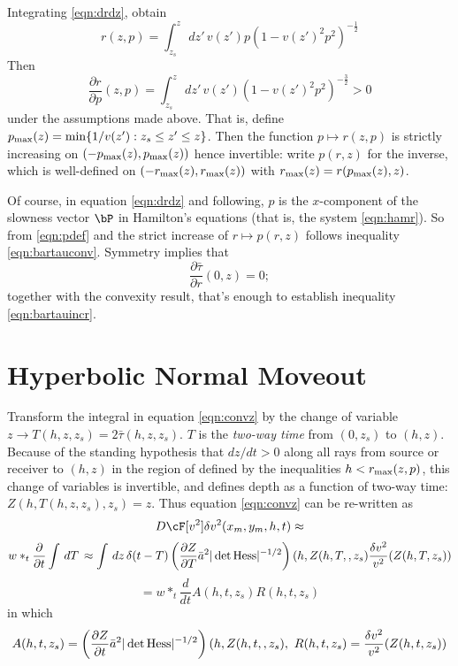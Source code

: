 Integrating \ref{eqn:drdz}, obtain
\begin{equation}
\label{eqn:intrz}
r(z,p)=\int_{z_s}^z \,dz' \, v(z')p (1-v(z')^2 p^2)^{-\frac{1}{2}}
\end{equation}
Then 
\begin{equation}
\label{eqn:drdp}
\frac{\partial r}{\partial p}(z,p) = \int_{z_s}^z \,dz' \, v(z') (1-v(z')^2 p^2)^{-\frac{3}{2}} >0
\end{equation}
under the assumptions made above. That is, define $p_{\rm max}(z) = \min \{1/v(z'): z_s \le z' \le z\}$. Then the function
$p \mapsto r(z,p)$ is strictly increasing on $(-p_{\rm max}(z),p_{\rm max}(z))$ hence invertible: write $p(r,z)$ for the inverse, which is well-defined on $(-r_{\rm max}(z),r_{\rm max}(z))$ with $r_{\rm max}(z) = r(p_{\rm max}(z),z)$.

Of course, in equation \ref{eqn:drdz} and following, $p$ is the $x$-component of the slowness vector $\bP$ in Hamilton's equations (that is, the system \ref{eqn:hamr}). So from \ref{eqn:pdef} and the strict increase of $r \mapsto p(r,z)$ follows inequality \ref{eqn:bartauconv}. Symmetry implies that 
\[
\frac{\partial \bar{\tau}}{\partial r}(0,z) = 0;
\]
together with the convexity result, that's enough to establish inequality \ref{eqn:bartauincr}.

\section{Hyperbolic Normal Moveout}
Transform the integral in equation \ref{eqn:convz} by the change of variable $z \rightarrow T(h,z,z_s) = 2\bar{\tau}(h,z,z_s)$. $T$ is the {\em two-way time} from $(0,z_s)$ to $(h,z)$. Because of the standing hypothesis that $dz/dt>0$ along all rays from source or receiver to $(h,z)$  in the region of defined by the inequalities $h<r_{\rm max}(z,p)$, this change of variables is invertible, and defines depth as a function of two-way time: $Z(h,T(h,z,z_s),z_s) = z$. Thus equation \ref{eqn:convz} can be re-written as 
\[
D\cF[v^2]\delta v^2(x_m,y_m,h,t) \approx 
\]
\[
w *_t \frac{\partial}{\partial t}\int\,dT\,
\approx \int\,dz\,\delta(t-T) \left(\frac{\partial Z}{\partial T}\bar{a}^2|\det {\rm Hess}|^{-1/2}\right)(h,Z(h,T,,z_s)\frac{\delta v^2}{v^2}(Z(h,T,z_s))
\]
\begin{equation}
\label{eqn:convt1}
= w*_t\frac{d}{dt}A(h,t,z_s) R(h,t,z_s)
\end{equation}
in which
\[
A(h,t,z_s) = \left(\frac{\partial Z}{\partial t}\bar{a}^2|\det {\rm Hess}|^{-1/2}\right)(h,Z(h,t,,z_s),\,\, R(h,t,z_s)  = \frac{\delta v^2}{v^2}(Z(h,t,z_s))
\]


